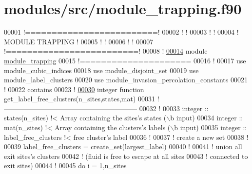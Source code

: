\hypertarget{module__trapping_8f90_source}{
\section{modules/src/module\-\_\-trapping.f90}
}

\begin{DoxyCode}
00001 \textcolor{comment}{!=========================!}
00002 \textcolor{comment}{!                         !}
00003 \textcolor{comment}{!                         !}
00004 \textcolor{comment}{!     MODULE TRAPPING     !}
00005 \textcolor{comment}{!                         !}
00006 \textcolor{comment}{!                         !}
00007 \textcolor{comment}{!=========================!}
00008 \textcolor{comment}{!}
\hypertarget{module__trapping_8f90_source_l00014}{}\hyperlink{classmodule__trapping}{00014} \textcolor{keyword}{module} \hyperlink{classmodule__trapping}{module_trapping}
00015 \textcolor{comment}{!=====================}
00016   \textcolor{comment}{!}
00017   use \textcolor{keywordflow}{module\_cubic\_indices}
00018   use \textcolor{keywordflow}{module\_disjoint\_set}
00019   use \textcolor{keywordflow}{module\_label\_clusters}
00020   use \textcolor{keywordflow}{module\_invasion\_percolation\_constants}
00021   \textcolor{comment}{!}
00022 \textcolor{keyword}{contains}
00023   \textcolor{comment}{!}
\hypertarget{module__trapping_8f90_source_l00030}{}\hyperlink{classmodule__trapping_acc4be246fb79d0cc00ed4f436feabd21}{00030}   \textcolor{keyword}{integer }\textcolor{keyword}{function }get\_label\_free\_clusters(n\_sites,states,mat)
00031   \textcolor{comment}{!-----------------------------------------------------------}
00032     \textcolor{comment}{!}
00033     \textcolor{keywordtype}{integer} :: states(n\_sites) \textcolor{comment}{!< Array containing the sites's states (\(\backslash\)b
       input)}
00034     \textcolor{keywordtype}{integer} :: mat(n\_sites) \textcolor{comment}{!< Array containing the clusters's labels (\(\backslash\)b
       input)}
00035     \textcolor{keywordtype}{integer} :: label\_free\_clusters \textcolor{comment}{!< free cluster's label}
00036     \textcolor{comment}{!}
00037     \textcolor{comment}{! create a new set}
00038     \textcolor{comment}{!}
00039     label\_free\_clusters = create\_set(largest\_label)
00040     \textcolor{comment}{!}
00041     \textcolor{comment}{! union all exit sites's clusters}
00042     \textcolor{comment}{! (fluid is free to escape at all sites}
00043     \textcolor{comment}{! connected to exit sites)}
00044     \textcolor{comment}{!}
00045     \textcolor{keyword}{do} i = 1,n\_sites

\end{DoxyCode}
